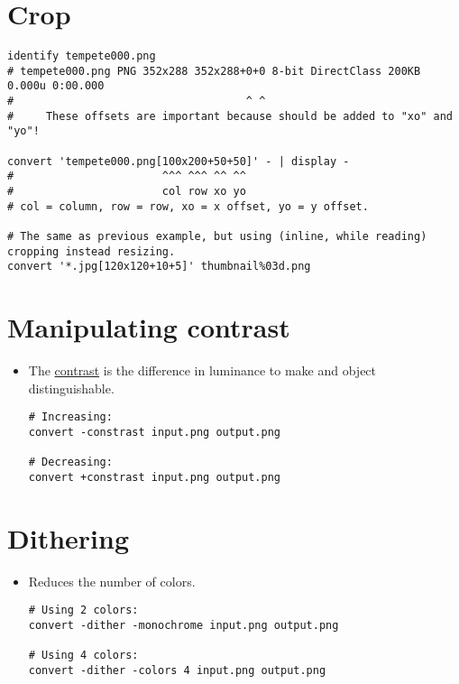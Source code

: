 
\section{Crop}

\begin{lstlisting}
identify tempete000.png
# tempete000.png PNG 352x288 352x288+0+0 8-bit DirectClass 200KB 0.000u 0:00.000
#                                    ^ ^
#     These offsets are important because should be added to "xo" and "yo"!

convert 'tempete000.png[100x200+50+50]' - | display -
#                       ^^^ ^^^ ^^ ^^
#                       col row xo yo
# col = column, row = row, xo = x offset, yo = y offset.

# The same as previous example, but using (inline, while reading) cropping instead resizing.
convert '*.jpg[120x120+10+5]' thumbnail%03d.png
\end{lstlisting}


\section{Manipulating contrast}

\begin{itemize}
\item The
  \href{http://en.wikipedia.org/wiki/Contrast_(vision)}{contrast} is
  the difference in luminance to make and object distinguishable.
\begin{lstlisting}
# Increasing:
convert -constrast input.png output.png

# Decreasing:
convert +constrast input.png output.png
\end{lstlisting}

\end{itemize}


\section{Dithering}

\begin{itemize}
\item Reduces the number of colors.
\begin{lstlisting}
# Using 2 colors:
convert -dither -monochrome input.png output.png

# Using 4 colors:
convert -dither -colors 4 input.png output.png
\end{lstlisting}

\end{itemize}

